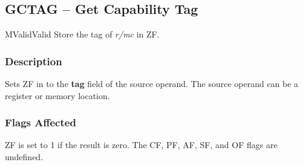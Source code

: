 \clearpage
{}
{}
\subsection*{GCTAG -- Get Capability Tag}

\begin{x86opcodetable}
  {M}{Valid}{Valid}
  {Store the tag of \emph{r/mc} in ZF.}
\end{x86opcodetable}

\begin{x86opentable}
\end{x86opentable}

\subsubsection*{Description}

Sets ZF in \RFLAGS{} to the \textbf{tag} field of the source
operand.  The source operand can be a register or memory location.

\subsubsection*{Flags Affected}

ZF is set to 1 if the result is zero.  The CF, PF, AF, SF, and OF
flags are undefined.
